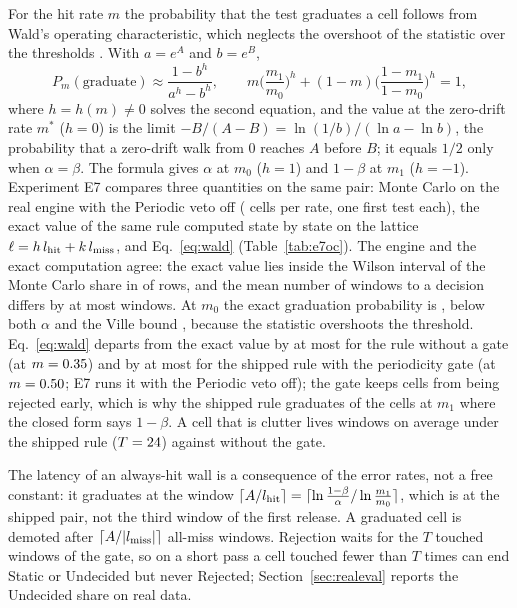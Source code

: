 For the hit rate $m$ the probability that the test graduates a cell follows from Wald's operating characteristic, which neglects the overshoot of the statistic over the thresholds \citep[Chapter~3]{wald1947sequential}. With $a=e^{A}$ and $b=e^{B}$,
\begin{equation}\label{eq:wald}
  P_m(\text{graduate})\approx\frac{1-b^{h}}{a^{h}-b^{h}},\qquad
  m\Big(\frac{m_1}{m_0}\Big)^{h}+(1-m)\Big(\frac{1-m_1}{1-m_0}\Big)^{h}=1,
\end{equation}
where $h=h(m)\ne0$ solves the second equation, and the value at the zero-drift rate $m^\ast$ ($h=0$) is the limit $-B/(A-B)=\ln(1/b)/(\ln a-\ln b)$, the probability that a zero-drift walk from $0$ reaches $A$ before $B$; it equals $1/2$ only when $\alpha=\beta$. The formula gives $\alpha$ at $m_0$ ($h=1$) and $1-\beta$ at $m_1$ ($h=-1$). Experiment E7 compares three quantities on the same pair: Monte Carlo on the real engine with the Periodic veto off (\SqCells{} cells per rate, one first test each), the exact value of the same rule computed state by state on the lattice $\ell=h\,l_{\mathrm{hit}}+k\,l_{\mathrm{miss}}$, and Eq.~\eqref{eq:wald} (Table~\ref{tab:e7oc}). The engine and the exact computation agree: the exact value lies inside the Wilson interval of the Monte Carlo share in \SqMcInside{} of \SqMcRows{} rows, and the mean number of windows to a decision differs by at most \SqWinGap{} windows. At $m_0$ the exact graduation probability is \SqExactMzero{}, below both $\alpha$ and the Ville bound \SqVille, because the statistic overshoots the threshold. Eq.~\eqref{eq:wald} departs from the exact value by at most \SqWaldGapPure{} for the rule without a gate (at $m=0.35$) and by at most \SqWaldGapShipped{} for the shipped rule with the periodicity gate (at $m=0.50$; E7 runs it with the Periodic veto off); the gate keeps cells from being rejected early, which is why the shipped rule graduates \SqExactMone{} of the cells at $m_1$ where the closed form says $1-\beta$. A cell that is clutter lives \SqWinMzero{} windows on average under the shipped rule ($T=24$) against \SqWinMzeroPure{} without the gate.



The latency of an always-hit wall is a consequence of the error rates, not a free constant: it graduates at the window $\lceil A/l_{\mathrm{hit}}\rceil=\lceil\ln\frac{1-\beta}{\alpha}/\ln\frac{m_1}{m_0}\rceil$, which is \SqLatency{} at the shipped pair, not the third window of the first release. A graduated cell is demoted after $\lceil A/|l_{\mathrm{miss}}|\rceil$ all-miss windows. Rejection waits for the $T$ touched windows of the gate, so on a short pass a cell touched fewer than $T$ times can end Static or Undecided but never Rejected; Section~\ref{sec:realeval} reports the Undecided share on real data.
